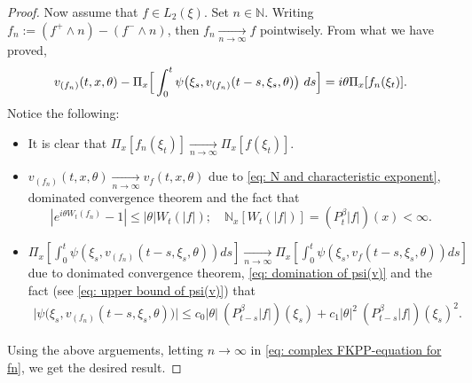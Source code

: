 \documentclass[12pt, a4paper]{amsart}
\theoremstyle{definition}
\numberwithin{equation}{section}
\begin{document}
\begin{proof}
    Now assume that $f\in L_2(\xi)$. Set $n \in \mathbb N$.
    Writing $f_n := (f^+ \wedge n) - (f^- \wedge n)$, then $f_n \xrightarrow[n\to \infty]{} f$ pointwisely. 
    From what we have proved, 
\begin{equation}
\label{eq: complex FKPP-equation for fn}
    v_{(f_n)}(t,x,\theta) - \Pi_{x} \Big[\int_0^t \psi\big(\xi_s,v_{(f_n)}(t-s,\xi_s,\theta)\big) ~ds\Big]
    \\= i\theta \Pi_{x} [f_n(\xi_t)].
\end{equation}
    Notice the following:
\begin{itemize}
\item
    It is clear that $\Pi_{x}[f_n(\xi_t)] \xrightarrow[n\to \infty]{} \Pi_{x}[f(\xi_t)]$.
\item
    $v_{(f_n)}(t,x,\theta) \xrightarrow[n\to \infty]{} v_f(t,x,\theta)$ due to \eqref{eq: N and characteristic exponent}, dominated convergence theorem and the fact that
\[
    |e^{i\theta W_t(f_n)} - 1| \leq |\theta| W_t(|f|);
    \quad \mathbb N_x[W_t(|f|)] = (P_t^\beta |f|)(x) < \infty.
\]
\item
    $\Pi_{x} [\int_0^t \psi(\xi_s,v_{(f_n)}(t-s,\xi_s,\theta))ds] \xrightarrow[n\to \infty]{} \Pi_{x} [\int_0^t \psi(\xi_s,v_{f}(t-s,\xi_s,\theta))ds]$ due to donimated convergence theorem, \eqref{eq: domination of psi(v)} and the fact (see \eqref{eq: upper bound of psi(v)}) that
\begin{align}
    \big|\psi\big(\xi_s,v_{(f_n)}(t-s,\xi_s,\theta)\big)\big|
    \leq c_0|\theta|~(P^\beta_{t-s} |f|)(\xi_s)+c_1 |\theta|^2 ~(P^\beta_{t-s} |f|)(\xi_s)^2.
\end{align}
\end{itemize}
    Using the above arguements, letting $n \to \infty$ in \eqref{eq: complex FKPP-equation for fn}, we get the desired result.
\end{proof}

  
\end{document}
